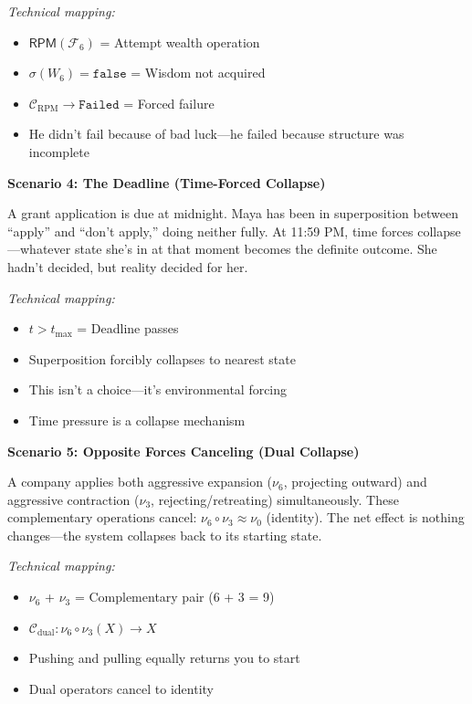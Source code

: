 \documentclass[11pt,twoside]{book}
\newcommand{\noe}[1]{\nu_{#1}}
\newcommand{\Foundations}{\mathcal{F}}
\newcommand{\RPM}{\mathsf{RPM}}
\newcommand{\Failed}{\mathtt{Failed}}
\newcommand{\Collapse}{\mathcal{C}}
\begin{document}
\begin{tcolorbox}[colback=yellow!5!white,colframe=yellow!65!black,title=\textbf{Real-Life Scenarios: Collapse Conditions},breakable]
\textit{Technical mapping:}
\begin{itemize}
    \item $\RPM(\Foundations_6)$ = Attempt wealth operation
    \item $\sigma(W_6) = \mathtt{false}$ = Wisdom not acquired
    \item $\Collapse_{\mathrm{RPM}} \to \Failed$ = Forced failure
    \item He didn't fail because of bad luck---he failed because structure was incomplete
\end{itemize}

\textbf{Scenario 4: The Deadline (Time-Forced Collapse)}

A grant application is due at midnight. Maya has been in superposition between ``apply'' and ``don't apply,'' doing neither fully. At 11:59 PM, time forces collapse---whatever state she's in at that moment becomes the definite outcome. She hadn't decided, but reality decided for her.

\textit{Technical mapping:}
\begin{itemize}
    \item $t > t_{\max}$ = Deadline passes
    \item Superposition forcibly collapses to nearest state
    \item This isn't a choice---it's environmental forcing
    \item Time pressure is a collapse mechanism
\end{itemize}

\textbf{Scenario 5: Opposite Forces Canceling (Dual Collapse)}

A company applies both aggressive expansion ($\noe{6}$, projecting outward) and aggressive contraction ($\noe{3}$, rejecting/retreating) simultaneously. These complementary operations cancel: $\noe{6} \circ \noe{3} \approx \noe{0}$ (identity). The net effect is nothing changes---the system collapses back to its starting state.

\textit{Technical mapping:}
\begin{itemize}
    \item $\noe{6}$ + $\noe{3}$ = Complementary pair (6 + 3 = 9)
    \item $\Collapse_{\mathrm{dual}}: \noe{6} \circ \noe{3}(X) \to X$
    \item Pushing and pulling equally returns you to start
    \item Dual operators cancel to identity
\end{itemize}


\end{tcolorbox}
\end{document}
